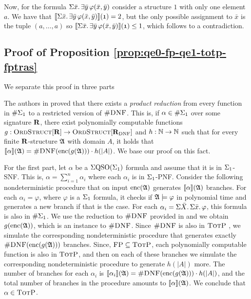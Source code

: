 Now, for the formula $\Sigma{\bar{x}}.\,\exists\bar{y}\,\varphi(\bar{x},\bar{y})$ consider a structure $\mathfrak{1}$ with only one element $a$. We have that ${\llbracket{}{\Sigma{\bar{x}}.\,\exists\bar{y}\,\varphi(\bar{x},\bar{y})}\rrbracket}(\mathfrak{1}) = 2$, but the only possible assignment to $\bar{x}$ is the tuple $(a,\ldots,a)$ so ${\llbracket{}{\Sigma{\bar{x}}.\,\exists\bar{y}\,\varphi(\bar{x},\bar{y})}\rrbracket}(\mathfrak{1}) \leq 1$, which follows to a contradiction.










\subsection*{Proof of Proposition \ref{prop:qe0-fp-qe1-totp-fptras}}

We separate this proof in three parts

\vspace{1em}
The authors in \cite{SalujaST95} proved that there exists a {\em product reduction} from every function in $\#\Sigma_{1}$ to a restricted version of $\textsc{\#DNF}$. This is, if $\alpha\in\#\Sigma_{1}$ over some signature $\mathbf{R}$, there exist polynomially computable functions $g:\text{\sc OrdStruct}[\mathbf{R}]\to\text{\sc OrdStruct}[\mathbf{R}_{\text{DNF}}]$ and $h:\mathbb{N}\to\mathbb{N}$ such that for every finite $\mathbf{R}$-structure $\mathfrak{A}$ with domain $A$, it holds that ${\llbracket{}{\alpha}\rrbracket}(\mathfrak{A}) = \textsc{\#DNF}({\rm enc}(g(\mathfrak{A})))\cdot h(\vert A \vert)$. We base our proof on this fact.

For the first part, let $\alpha$ be a $\Sigma{\rm QSO}(\Sigma_{1})$ formula and assume that it is in $\Sigma_{1}$-SNF. This is, $\alpha = \sum_{i = 1}^n\alpha_i$ where each $\alpha_i$ is in $\Sigma_{1}$-PNF. Consider the following nondeterministic procedure that on input ${\rm enc}(\mathfrak{A})$ generates ${\llbracket{}{\alpha}\rrbracket}(\mathfrak{A})$ branches. For each $\alpha_i = \varphi$, where $\varphi$ is a $\Sigma_{1}$ formula, it checks if $\mathfrak{A}\models\varphi$ in polynomial time and generates a new branch if that is the case. For each $\alpha_i = \Sigma{\bar{X}}.\,\Sigma{\bar{x}}.\,\varphi$, this formula is also in $\#\Sigma_{1}$. We use the reduction to $\textsc{\#DNF}$ provided in \cite{SalujaST95} and we obtain $g({\rm enc}(\mathfrak{A}))$, which is an instance to $\textsc{\#DNF}$. Since $\textsc{\#DNF}$ is also in $\text{\sc TotP}$ \cite{PagourtzisZ06}, we simulate the corresponding nondeterministic procedure that generates exactly $\textsc{\#DNF}({\rm enc}(g(\mathfrak{A})))$ branches. Since, $\text{\sc FP}\subseteq\text{\sc TotP}$\cite{PagourtzisZ06}, each polynomially computable function is also in $\text{\sc TotP}$, and then on each of these branches we simulate the corresponding nondeterministic procedure to generate $h(\vert A \vert)$ more. The number of branches for each $\alpha_i$ is ${\llbracket{}{\alpha_i}\rrbracket}(\mathfrak{A}) = \textsc{\#DNF}({\rm enc}(g(\mathfrak{A})))\cdot h(\vert A \vert)$, and the total number of branches in the procedure amounts to ${\llbracket{}{\alpha}\rrbracket}(\mathfrak{A})$. We conclude that $\alpha\in\text{\sc TotP}$.

